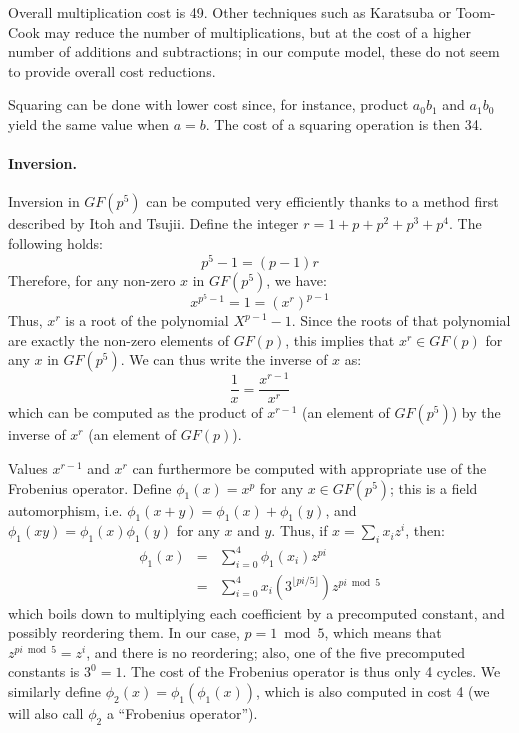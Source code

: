 \documentclass{llncs}
\newcommand{\GF}{GF}
\begin{document}
Overall multiplication cost is 49. Other techniques such as Karatsuba
or Toom-Cook may reduce the number of multiplications, but at the cost
of a higher number of additions and subtractions; in our compute model,
these do not seem to provide overall cost reductions.

Squaring can be done with lower cost since, for instance, product $a_0 b_1$
and $a_1 b_0$ yield the same value when $a = b$. The cost of a squaring
operation is then 34.

\paragraph{Inversion.} Inversion in $\GF(p^5)$ can be computed very
efficiently thanks to a method first described by Itoh and
Tsujii\cite{ItoTsu1988}. Define the integer $r = 1 + p + p^2 + p^3 +
p^4$. The following holds:
\begin{equation*}
    p^5 - 1 = (p - 1) r
\end{equation*}
Therefore, for any non-zero $x$ in $\GF(p^5)$, we have:
\begin{equation*}
    x^{p^5-1} = 1 = (x^r)^{p-1}
\end{equation*}
Thus, $x^r$ is a root of the polynomial $X^{p-1}-1$. Since the roots of
that polynomial are exactly the non-zero elements of $\GF(p)$, this
implies that $x^r \in \GF(p)$ for any $x$ in $\GF(p^5)$. We can thus
write the inverse of $x$ as:
\begin{equation*}
    \frac{1}{x} = \frac{x^{r-1}}{x^r}
\end{equation*}
which can be computed as the product of $x^{r-1}$ (an element of $\GF(p^5)$)
by the inverse of $x^r$ (an element of $\GF(p)$).

Values $x^{r-1}$ and $x^r$ can furthermore be computed with appropriate
use of the Frobenius operator. Define $\phi_1(x) = x^p$ for any $x \in
\GF(p^5)$; this is a field automorphism, i.e. $\phi_1(x + y) = \phi_1(x)
+ \phi_1(y)$, and $\phi_1(xy) = \phi_1(x) \phi_1(y)$ for any $x$ and
$y$. Thus, if $x = \sum_i x_i z^i$, then:
\begin{eqnarray*}
    \phi_1(x) &=& \sum_{i=0}^4 \phi_1(x_i) z^{pi} \\
              &=& \sum_{i=0}^4 x_i (3^{\lfloor pi/5 \rfloor}) z^{pi \bmod 5}
\end{eqnarray*}
which boils down to multiplying each coefficient by a precomputed
constant, and possibly reordering them. In our case, $p = 1 \bmod 5$,
which means that $z^{pi \bmod 5} = z^i$, and there is no reordering;
also, one of the five precomputed constants is $3^0 = 1$. The cost of
the Frobenius operator is thus only 4 cycles. We similarly define
$\phi_2(x) = \phi_1(\phi_1(x))$, which is also computed in cost 4 (we
will also call $\phi_2$ a ``Frobenius operator'').
\end{document}
